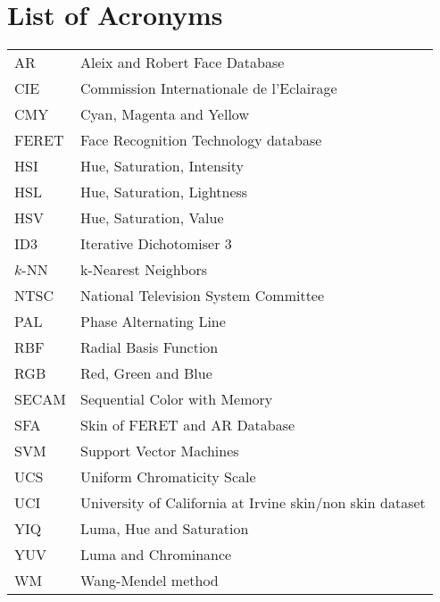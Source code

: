 \documentclass[11pt,twoside,a4paper]{book}
\theoremstyle{plain}
\theoremstyle{definition}
\begin{document}
\chapter{List of Acronyms}
\begin{tabular}{ll}
    AR          & Aleix and Robert Face Database\\
    CIE         & Commission Internationale de l'Eclairage\\
    CMY         & Cyan, Magenta and Yellow\\
    FERET       & Face Recognition Technology database\\
    HSI         & Hue, Saturation, Intensity\\
    HSL         & Hue, Saturation, Lightness\\
    HSV         & Hue, Saturation, Value\\
    ID3         & Iterative Dichotomiser 3\\
    $k$-NN      & k-Nearest Neighbors\\
    NTSC        & National Television System Committee\\
    PAL         & Phase Alternating Line\\
    RBF         & Radial Basis Function\\
    RGB         & Red, Green and Blue\\
    SECAM       & Sequential Color with Memory\\
    SFA         & Skin of FERET and AR Database\\
    SVM         & Support Vector Machines\\
    UCS         & Uniform Chromaticity Scale\\
    UCI         & University of California at Irvine skin/non skin dataset\\
    YIQ         & Luma, Hue and Saturation\\
    YUV         & Luma and Chrominance\\
    WM          & Wang-Mendel method\\
\end{tabular}

\end{document}
